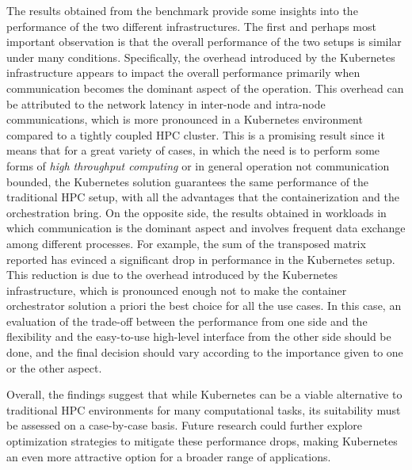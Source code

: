 The results obtained from the benchmark provide some insights into the
performance of the two different infrastructures. The first and perhaps most
important observation is that the overall performance of the two setups is
similar under many conditions.
Specifically, the overhead introduced by the Kubernetes infrastructure appears
to impact the overall performance primarily when communication becomes the
dominant aspect of the operation.
This overhead can be attributed to the network latency in inter-node and intra-node
communications, which is more pronounced in a Kubernetes environment compared to
a tightly coupled HPC cluster.
This is a promising result since it means that for a great variety of cases, in
which the need is to perform some forms of \textit{high throughput computing} or
in general operation not communication bounded, the Kubernetes solution
guarantees the same performance of the traditional HPC setup, with all the
advantages that the containerization and the orchestration bring.
On the opposite side, the results obtained in workloads in which communication
is the dominant aspect and involves frequent data exchange among different
processes.
For example, the sum of the transposed matrix reported has evinced a significant
drop in performance in the Kubernetes setup.
This reduction is due to the overhead introduced by the Kubernetes
infrastructure, which is pronounced enough not to make the container
orchestrator solution a priori the best choice for all the use cases.
In this case, an evaluation of the trade-off between the performance from one
side and the flexibility and the easy-to-use high-level interface from the other
side should be done, and the final decision should vary according to the
importance given to one or the other aspect.

Overall, the findings suggest that while Kubernetes can be a viable alternative
to traditional HPC environments for many computational tasks, its suitability
must be assessed on a case-by-case basis.
Future research could further explore optimization strategies to mitigate these
performance drops, making Kubernetes an even more attractive option for a
broader range of applications.
